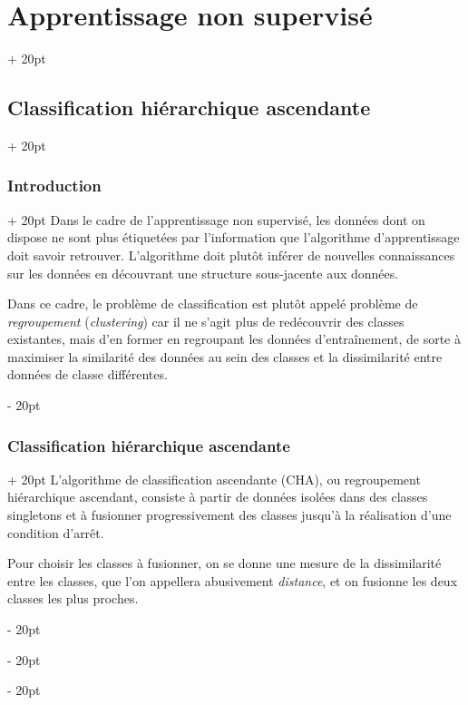 \documentclass[a4paper, 12pt, twoside]{article}
\newcommand{\ind}[1][20pt]{\advance\leftskip + #1}
\newcommand{\deind}[1][20pt]{\advance\leftskip - #1}
\newenvironment{indt}[2][20pt]{#2 \par \ind[#1]}{\par \deind} %
\begin{document}
    \begin{indt}{\section{Apprentissage non supervisé}}
        \begin{indt}{\subsection{Classification hiérarchique ascendante}}
            \begin{indt}{\subsubsection{Introduction}}
                Dans le cadre de l'apprentissage non supervisé, les données dont on dispose ne sont plus étiquetées par l'information que l'algorithme d'apprentissage doit savoir retrouver.
                L'algorithme doit plutôt inférer de nouvelles connaissances sur les données en découvrant une structure sous-jacente aux données.

                Dans ce cadre, le problème de classification est plutôt appelé problème de \emph{regroupement} (\textit{clustering}) car il ne s'agit plus de redécouvrir des classes existantes, mais d'en former en regroupant les données d'entraînement, de sorte à maximiser la similarité des données au sein des classes et la dissimilarité entre données de classe différentes.
            \end{indt}

            \vspace{12pt}
            
            \begin{indt}{\subsubsection{Classification hiérarchique ascendante}}
                L'algorithme de classification ascendante (CHA), ou regroupement hiérarchique ascendant, consiste à partir de données isolées dans des classes singletons et à fusionner progressivement des classes jusqu'à la réalisation d'une condition d'arrêt.

                Pour choisir les classes à fusionner, on se donne une mesure de la dissimilarité entre les classes, que l'on appellera abusivement \emph{distance}, et on fusionne les deux classes les plus proches.


\end{indt}
\end{indt}
\end{indt}
\end{document}
